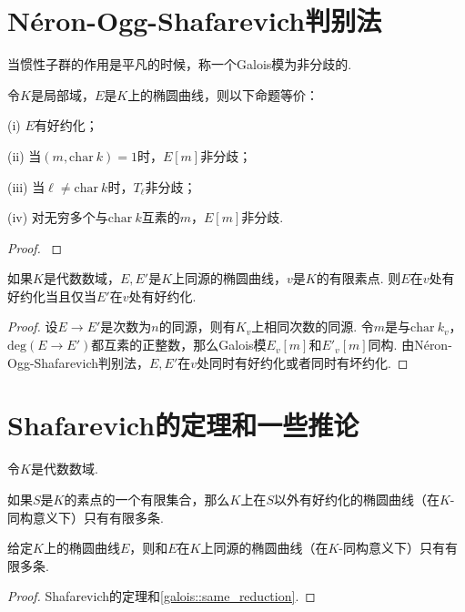 \section{Néron-Ogg-Shafarevich判别法}

当惯性子群的作用是平凡的时候，称一个Galois模为非分歧的.

\begin{cthm}
    令$K$是局部域，$E$是$K$上的椭圆曲线，则以下命题等价：

    (i) $E$有好约化；

    (ii) 当$(m, \mathrm{char}\ k)=1$时，$E[m]$非分歧；

    (iii) 当$\ell\neq \mathrm{char}\ k$时，$T_{\ell}$非分歧；

    (iv) 对无穷多个与$\mathrm{char}\ k$互素的$m$，$E[m]$非分歧.
\end{cthm}

\begin{proof}
    {\parencite[][p. 201]{silverman2009arithmetic}}
\end{proof}

\begin{ccor}
    如果$K$是代数数域，$E, E'$是$K$上同源的椭圆曲线，$v$是$K$的有限素点. 则$E$在$v$处有好约化当且仅当$E'$在$v$处有好约化. \label{galois::same_reduction}
\end{ccor}

\begin{proof}
    设$E\to E'$是次数为$n$的同源，则有$K_v$上相同次数的同源. 令$m$是与$\mathrm{char}\ k_v$，$\mathrm{deg}(E\to E')$都互素的正整数，那么Galois模$E_v[m]$和$E'_v[m]$同构. 由Néron-Ogg-Shafarevich判别法，$E, E'$在$v$处同时有好约化或者同时有坏约化.
\end{proof}


\section{Shafarevich的定理和一些推论}

令$K$是代数数域.

\begin{cthm}[Shafarevich]
    如果$S$是$K$的素点的一个有限集合，那么$K$上在$S$以外有好约化的椭圆曲线（在$K$-同构意义下）只有有限多条.
\end{cthm}

\begin{ccor}
    给定$K$上的椭圆曲线$E$，则和$E$在$K$上同源的椭圆曲线（在$K$-同构意义下）只有有限多条.\label{galois::isogeny_finite_curves}
\end{ccor}

\begin{proof}
    Shafarevich的定理和\ref{galois::same_reduction}.
\end{proof}
